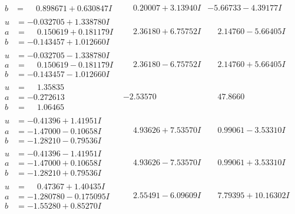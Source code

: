\documentclass[1p]{elsarticle_modified}
\theoremstyle{definition}
\begin{document}
$$\begin{array}{c|c|c}
\begin{aligned}
b &= \phantom{-}0.898671 + 0.630847 I\end{aligned}
 & \phantom{-}0.20007 + 3.13940 I & -5.66733 - 4.39177 I \\ \hline\begin{aligned}
u &= -0.032705 + 1.338780 I \\
a &= \phantom{-}0.150619 + 0.181179 I \\
b &= -0.143457 + 1.012660 I\end{aligned}
 & \phantom{-}2.36180 + 6.75752 I & \phantom{-}2.14760 - 5.66405 I \\ \hline\begin{aligned}
u &= -0.032705 - 1.338780 I \\
a &= \phantom{-}0.150619 - 0.181179 I \\
b &= -0.143457 - 1.012660 I\end{aligned}
 & \phantom{-}2.36180 - 6.75752 I & \phantom{-}2.14760 + 5.66405 I \\ \hline\begin{aligned}
u &= \phantom{-}1.35835\phantom{ +0.000000I} \\
a &= -0.272613\phantom{ +0.000000I} \\
b &= \phantom{-}1.06465\phantom{ +0.000000I}\end{aligned}
 & -2.53570\phantom{ +0.000000I} & \phantom{-}47.8660\phantom{ +0.000000I} \\ \hline\begin{aligned}
u &= -0.41396 + 1.41951 I \\
a &= -1.47000 - 0.10658 I \\
b &= -1.28210 - 0.79536 I\end{aligned}
 & \phantom{-}4.93626 + 7.53570 I & \phantom{-}0.99061 - 3.53310 I \\ \hline\begin{aligned}
u &= -0.41396 - 1.41951 I \\
a &= -1.47000 + 0.10658 I \\
b &= -1.28210 + 0.79536 I\end{aligned}
 & \phantom{-}4.93626 - 7.53570 I & \phantom{-}0.99061 + 3.53310 I \\ \hline\begin{aligned}
u &= \phantom{-}0.47367 + 1.40435 I \\
a &= -1.280780 - 0.175095 I \\
b &= -1.55280 + 0.85270 I\end{aligned}
 & \phantom{-}2.55491 - 6.09609 I & \phantom{-}7.79395 + 10.16302 I \\ \hline\begin{aligned}

\end{aligned}
\end{array}$$
\end{document}

